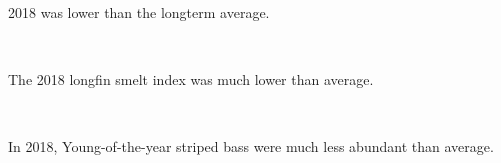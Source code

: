 \documentclass[
]{book}
\begin{document}
\begin{panel-grid}
\begin{columns-nocenter}
\begin{column800}
\begin{expand}
\end{expand}

\end{column800}

\end{columns-nocenter}

\begin{columns-nocenter}

\begin{column800}

2018 was lower than the longterm average.

\end{column800}

\begin{column40}

~

\end{column40}

\begin{column800}

The 2018 longfin smelt index was much lower than average.

\end{column800}

\begin{column40}

~

\end{column40}

\begin{column800}

In 2018, Young-of-the-year striped bass were much less abundant than average.

\end{column800}

\end{columns-nocenter}

\end{panel-grid}
\end{document}
